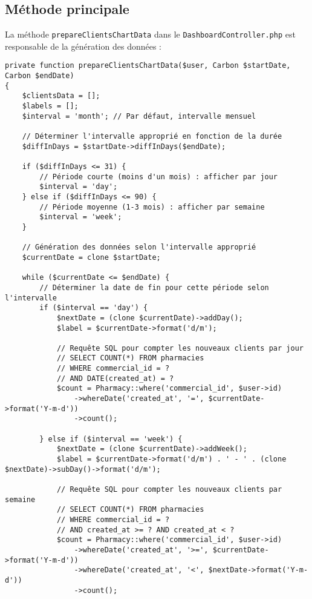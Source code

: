 \documentclass[12pt,a4paper]{article}
\begin{document}
\subsection{Méthode principale}
La méthode \texttt{prepareClientsChartData} dans le \texttt{DashboardController.php} est responsable de la génération des données :

\begin{lstlisting}[caption=Méthode prepareClientsChartData]
private function prepareClientsChartData($user, Carbon $startDate, Carbon $endDate)
{
    $clientsData = [];
    $labels = [];
    $interval = 'month'; // Par défaut, intervalle mensuel
    
    // Déterminer l'intervalle approprié en fonction de la durée
    $diffInDays = $startDate->diffInDays($endDate);
    
    if ($diffInDays <= 31) {
        // Période courte (moins d'un mois) : afficher par jour
        $interval = 'day';
    } else if ($diffInDays <= 90) {
        // Période moyenne (1-3 mois) : afficher par semaine
        $interval = 'week';
    }
    
    // Génération des données selon l'intervalle approprié
    $currentDate = clone $startDate;
    
    while ($currentDate <= $endDate) {
        // Déterminer la date de fin pour cette période selon l'intervalle
        if ($interval == 'day') {
            $nextDate = (clone $currentDate)->addDay();
            $label = $currentDate->format('d/m');
            
            // Requête SQL pour compter les nouveaux clients par jour
            // SELECT COUNT(*) FROM pharmacies 
            // WHERE commercial_id = ? 
            // AND DATE(created_at) = ?
            $count = Pharmacy::where('commercial_id', $user->id)
                ->whereDate('created_at', '=', $currentDate->format('Y-m-d'))
                ->count();
                
        } else if ($interval == 'week') {
            $nextDate = (clone $currentDate)->addWeek();
            $label = $currentDate->format('d/m') . ' - ' . (clone $nextDate)->subDay()->format('d/m');
            
            // Requête SQL pour compter les nouveaux clients par semaine
            // SELECT COUNT(*) FROM pharmacies 
            // WHERE commercial_id = ? 
            // AND created_at >= ? AND created_at < ?
            $count = Pharmacy::where('commercial_id', $user->id)
                ->whereDate('created_at', '>=', $currentDate->format('Y-m-d'))
                ->whereDate('created_at', '<', $nextDate->format('Y-m-d'))
                ->count();
                

\end{lstlisting}
\end{document}
